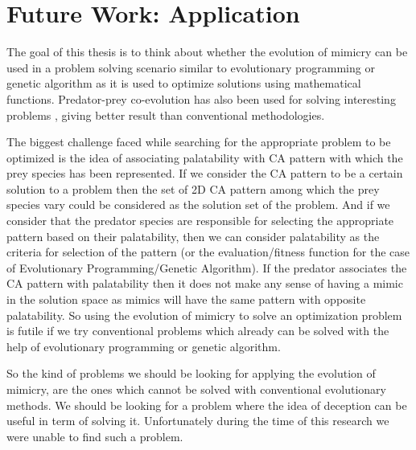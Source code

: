 \chapter{Future Work: Application}
\label{chapter:application}

The goal of this thesis is to think about whether the evolution of mimicry can be used in a problem solving scenario similar to evolutionary programming or genetic algorithm as it is used to optimize solutions using mathematical functions. Predator-prey co-evolution has also been used for solving interesting problems \cite{hillis1990}, giving better result than conventional methodologies. 

The biggest challenge faced while searching for the appropriate problem to be optimized is the idea of associating palatability with CA pattern with which the prey species has been represented. If we consider the CA pattern to be a certain solution to a problem then the set of 2D CA pattern among which the prey species vary could be considered as the solution set of the problem. And if we consider that the predator species are responsible for selecting the appropriate pattern based on their palatability, then we can consider palatability as the criteria for selection of the pattern (or the evaluation/fitness function for the case of Evolutionary Programming/Genetic Algorithm). If the predator associates the CA pattern with palatability then it does not make any sense of having a mimic in the solution space as mimics will have the same pattern with opposite palatability. So using the evolution of mimicry to solve an optimization problem is futile if we try conventional problems which already can be solved with the help of evolutionary programming or genetic algorithm. 

So the kind of problems we should be looking for applying the evolution of mimicry, are the ones which cannot be solved with conventional evolutionary methods. We should be looking for a problem where the idea of deception can be useful in term of solving it. Unfortunately during the time of this research we were unable to find such a problem. 
